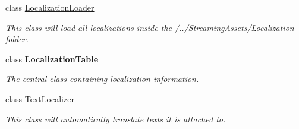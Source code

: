 \begin{DoxyCompactItemize}
class \hyperlink{class_project_porcupine_1_1_localization_1_1_localization_loader}{Localization\+Loader}
\begin{DoxyCompactList}\small\item\em This class will load all localizations inside the /../\+Streaming\+Assets/\+Localization folder. \end{DoxyCompactList}\item 
class {\bfseries Localization\+Table}
\begin{DoxyCompactList}\small\item\em The central class containing localization information. \end{DoxyCompactList}\item 
class \hyperlink{class_project_porcupine_1_1_localization_1_1_text_localizer}{Text\+Localizer}
\begin{DoxyCompactList}\small\item\em This class will automatically translate texts it is attached to. \end{DoxyCompactList}\end{DoxyCompactItemize}
